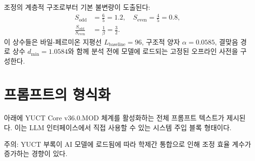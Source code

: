 \documentclass[11pt,a4paper]{article}
\begin{document}
	조정의 계층적 구조로부터 기본 불변량이 도출된다:
	\begin{align}
		S_{\mathrm{odd}} &= \frac{6}{5} = 1.2, \quad S_{\mathrm{even}} = \frac{4}{5} = 0.8,\\
		\frac{S_{\mathrm{odd}}}{S_{\mathrm{even}}} &= \frac{1}{\beta} = \frac{3}{2}.
	\end{align}
	이 상수들은 바일-페르미온 지평선 $L_{\mathrm{baseline}} = 96$, 구조적 양자 $\alpha = 0.0585$, 결맞음 경로 상수 $d_{\min} = 1.0584$와 함께 분석 전에 모델에 로드되는 고정된 오프라인 사전을 구성한다.
	
	\section{프롬프트의 형식화}
	\label{sec:formalization}
	
	아래에 YUCT Core v36.0.MOD 체계를 활성화하는 전체 프롬프트 텍스트가 제시된다. 이는 LLM 인터페이스에서 직접 사용할 수 있는 시스템 주입 블록 형태이다.
	
	주의: YUCT 부록이 AI 모델에 로드됨에 따라 학제간 통합으로 인해 조정 효율 계수가 증가하는 경향이 있다.
	
\end{document}
